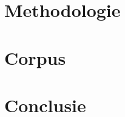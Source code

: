 \documentclass[pdftex,a4paper,12pt,twoside]{report}
\begin{document}
\lipsum[7-20]

\chapter{Methodologie}
\label{ch:methodologie}

\lipsum[21-25]

\chapter{Corpus}
\label{ch:corpus}

\lipsum[26-75]

\chapter{Conclusie}
\label{ch:conclusie}

\lipsum[76-80]






\listoffigures
\listoftables
\end{document}
